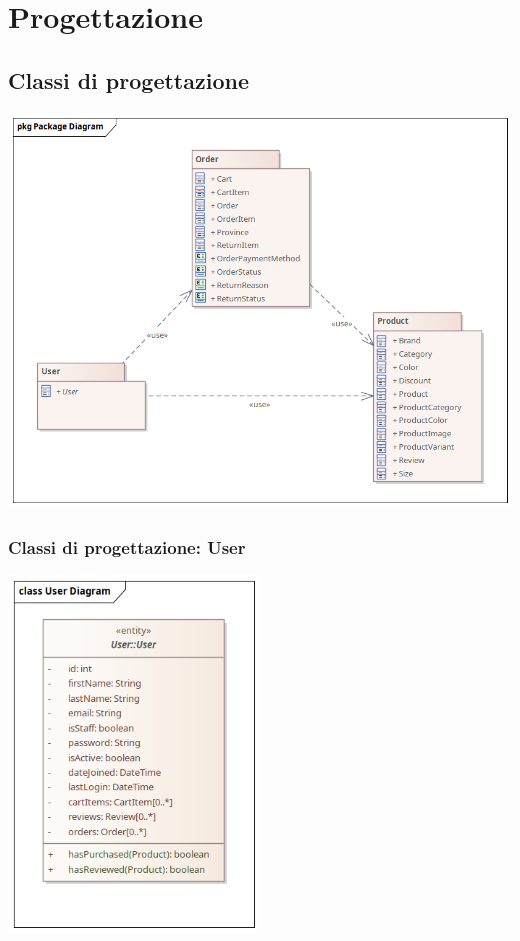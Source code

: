 \chapter{Progettazione}
\label{ch:Progettazione}
\section{Classi di progettazione}
\begin{center}
  \includegraphics[width=\textwidth]{immagini/Progettazione/ClassDiagrams/Package.png}
\end{center}

\subsection{Classi di progettazione: User}
\begin{center}
  \includegraphics[width=0.5\textwidth]{immagini/Progettazione/ClassDiagrams/User.png}
\end{center}

